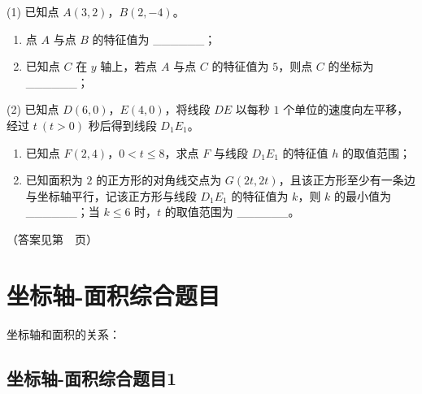 \begin{center}
\end{center}

(1) 已知点 \(A(3,2)\)，\(B(2,-4)\)。

\begin{enumerate}
    \item[①] 点 \(A\) 与点 \(B\) 的特征值为 \_\_\_\_\_\_；
    \item[②] 已知点 \(C\) 在 \(y\) 轴上，若点 \(A\) 与点 \(C\) 的特征值为 \(5\)，则点 \(C\) 的坐标为 \_\_\_\_\_\_；
\end{enumerate}

\vspace{5cm}

(2) 已知点 \(D(6,0)\)，\(E(4,0)\)，将线段 \(DE\) 以每秒 \(1\) 个单位的速度向左平移，经过 \(t\ (t>0)\) 秒后得到线段 \(D_1E_1\)。

\begin{enumerate}
    \item[①] 已知点 \(F(2,4)\)，\(0 < t \le 8\)，求点 \(F\) 与线段 \(D_1E_1\) 的特征值 \(h\) 的取值范围；
    \item[②] 已知面积为 \(2\) 的正方形的对角线交点为 \(G(2t,2t)\)，且该正方形至少有一条边与坐标轴平行，记该正方形与线段 \(D_1E_1\) 的特征值为 \(k\)，则 \(k\) 的最小值为 \_\_\_\_\_\_；当 \(k \le 6\) 时，\(t\) 的取值范围为 \_\_\_\_\_\_。
\end{enumerate}

\vspace{8cm}

（答案见第~\pageref{坐标轴-题目2}~页）


\section{坐标轴-面积综合题目}

坐标轴和面积的关系：

\subsection{坐标轴-面积综合题目1}

